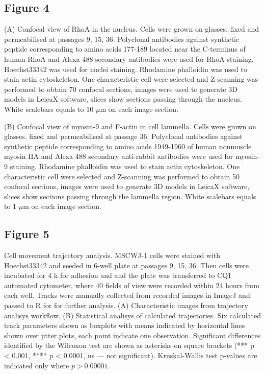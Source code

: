 \documentclass[alpha-refs]{wiley-article}
\begin{document}
\subsection*{Figure 4}
(A) Confocal view of RhoA in the nucleus.
Cells were grown on glasses, fixed and permeabilised at passages 9, 15, 36.
Polyclonal antibodies against synthetic peptide corresponding to amino acids 177-189 located near the C-terminus of human RhoA and Alexa 488 secondary antibodies were used for RhoA staining.
Hoechst33342 was used for nuclei staining.
Rhodamine phalloidin was used to stain actin cytoskeleton.
One characteristic cell were selected and Z-scanning was performed to obtain 70 confocal sections, images were used to generate 3D models in LeicaX software, slices show sections passing through the nucleus.
White scalebars equals to 10 $\mu$m on each image section.

(B) Confocal view of myosin-9 and F-actin in cell lammella.
Cells were grown on glasses, fixed and permeabilised at passage 36.
Polyclonal antibodies against synthetic peptide corresponding to amino acids 1949-1960 of human nonmuscle myosin IIA and Alexa 488 secondary anti-rabbit antibodies were used for myosin-9 staining.
Rhodamine phalloidin was used to stain actin cytoskeleton.
One characteristic cell were selected and Z-scanning was performed to obtain 50 confocal sections, images were used to generate 3D models in LeicaX software, slices show sections passing through the lammella region.
White scalebars equals to 1 $\mu$m on each image section.


\subsection*{Figure 5}
Cell movement trajectory analysis.
MSCWJ-1 cells were stained with Hoechst33342 and seeded in 6-well plate at passages 9, 15, 36.
Then cells were incubated for 4 h for adhesion and and the plate was transferred to CQ1 automated cytometer, where 40 fields of view were recorded within 24 hours from each well.
Tracks were manually collected from recorded images in ImageJ and passed to R for for further analysis.
(A) Characteristic images from trajectory analisys workflow.
(B) Statistical analisys of calculated trajectories.
Six calculated track parameters shown as boxplots with means indicated by horizontal lines shown over jitter plots, each point indicate one observation.
Significant differences identified by the Wilcoxon test are shown as asterisks on square brackets (*** p < 0.001, **** p < 0.0001, ns --- not significant).
Kruskal-Wallis test p-values are indicated only where $p > 0.00001$.
\end{document}
